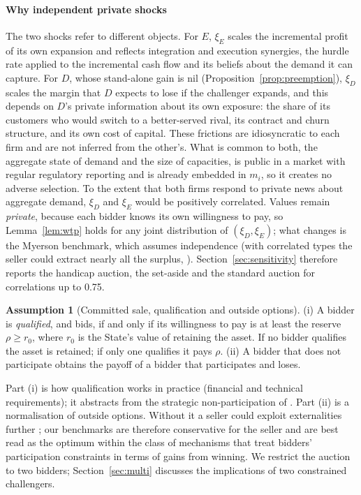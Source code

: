 \documentclass[12pt,a4paper]{article}
\theoremstyle{definition}
\newtheorem{assumption}{Assumption}
\theoremstyle{remark}
\begin{document}
\paragraph{Why independent private shocks} The two shocks refer to different objects. For $E$, $\xi_E$ scales the incremental profit of its own expansion and reflects integration and execution synergies, the hurdle rate applied to the incremental cash flow and its beliefs about the demand it can capture. For $D$, whose stand-alone gain is nil (Proposition~\ref{prop:preemption}), $\xi_D$ scales the margin that $D$ expects to lose if the challenger expands, and this depends on $D$'s private information about its own exposure: the share of its customers who would switch to a better-served rival, its contract and churn structure, and its own cost of capital. These frictions are idiosyncratic to each firm and are not inferred from the other's. What is common to both, the aggregate state of demand and the size of capacities, is public in a market with regular regulatory reporting and is already embedded in $m_i$, so it creates no adverse selection. To the extent that both firms respond to private news about aggregate demand, $\xi_D$ and $\xi_E$ would be positively correlated. Values remain \emph{private}, because each bidder knows its own willingness to pay, so Lemma~\ref{lem:wtp} holds for any joint distribution of $(\xi_D,\xi_E)$; what changes is the Myerson benchmark, which assumes independence (with correlated types the seller could extract nearly all the surplus, \citealt{cremermclean1988}). Section~\ref{sec:sensitivity} therefore reports the handicap auction, the set-aside and the standard auction for correlations up to 0.75.

\begin{assumption}[Committed sale, qualification and outside options]\label{ass:sale}
(i) A bidder is \emph{qualified}, and bids, if and only if its willingness to pay is at least the reserve $\rho\ge r_0$, where $r_0$ is the State's value of retaining the asset. If no bidder qualifies the asset is retained; if only one qualifies it pays $\rho$. (ii) A bidder that does not participate obtains the payoff of a bidder that participates and loses.
\end{assumption}

Part (i) is how qualification works in practice (financial and technical requirements); it abstracts from the strategic non-participation of \citet{jehielmoldovanu1996}. Part (ii) is a normalisation of outside options. Without it a seller could exploit externalities further \citep{jms1996,jms1999}; our benchmarks are therefore conservative for the seller and are best read as the optimum within the class of mechanisms that treat bidders' participation constraints in terms of gains from winning. We restrict the auction to two bidders; Section~\ref{sec:multi} discusses the implications of two constrained challengers.
\end{document}
